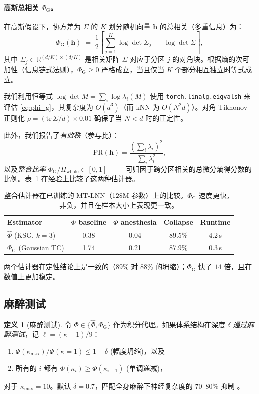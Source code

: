 \documentclass[11pt]{article}
\theoremstyle{definition}
\newtheorem{definition}{定义}[section]
\newcommand{\RR}{\mathbb{R}}
\newcommand{\vh}{\mathbf{h}}
\newcommand{\phihat}{\hat{\Phi}}
\newcommand{\phig}{\Phi_{\mathrm{G}}}
\begin{document}
\paragraph{高斯总相关 $\phig$。}
在高斯假设下，协方差为 $\Sigma$ 的 $K$ 划分随机向量 $\vh$ 的总相关（多重信息）为：
\begin{equation}
  \phig(\vh) \;=\; \frac{1}{2}\left[\sum_{j=1}^{K}\log\det\Sigma_j \;-\; \log\det\Sigma\right],
  \label{eq:phi_g}
\end{equation}
其中 $\Sigma_j\in\RR^{(d/K)\times(d/K)}$ 是相关矩阵 $\Sigma$ 对应于分区 $j$ 的对角块。根据熵的次可加性（信息链式法则），$\phig \ge 0$ 严格成立，当且仅当 $K$ 个部分相互独立时等式成立。

我们利用恒等式 $\log\det M = \sum_i\log\lambda_i(M)$ 使用 \texttt{torch.linalg.eigvalsh} 来评估 \eqref{eq:phi_g}，其复杂度为 $O(d^3)$（而 kNN 为 $O(N^2 d)$）。对角 Tikhonov 正则化 $\rho = (\mathrm{tr}\,\Sigma / d)\times 0.01$ 确保了当 $N < d$ 时的正定性。

此外，我们报告了\emph{有效秩}（参与比）：
\begin{equation}
  \mathrm{PR}(\vh) = \frac{\left(\sum_i\lambda_i\right)^2}{\sum_i\lambda_i^2},
  \label{eq:pr}
\end{equation}
以及\emph{整合比率} $\phig / H_\text{whole} \in [0,1]$ —— 可归因于跨分区相关的总微分熵得分数的比例。表~\ref{tab:phi_compare} 在经验上比较了这两种估计器。

\begin{table}[h]
\centering
\caption{整合估计器在已训练的 MT-LNN（128M 参数）上的比较。$\phig$ 速度更快，非负，并且在样本大小上表现更一致。}
\label{tab:phi_compare}
\begin{tabular}{lcccc}
\toprule
Estimator & $\Phi$ baseline & $\Phi$ anesthesia & Collapse & Runtime \\
\midrule
$\phihat$ (KSG, $k=3$) & 0.38 & 0.04 & 89.5\% & 4.2\,s \\
$\phig$ (Gaussian TC) & 1.74 & 0.21 & 87.9\% & 0.3\,s \\
\bottomrule
\end{tabular}
\end{table}

两个估计器在定性结论上是一致的（89\% 对 88\% 的坍缩）；$\phig$ 快了 $14$ 倍，且在数值上更加稳定。

\subsection{麻醉测试}
\begin{definition}[麻醉测试]
令 $\Phi\in\{\phihat,\phig\}$ 作为积分代理。如果体系结构在深度 $\delta$ \emph{通过麻醉测试}，记 $\ell=(\kappa-1)/9$：
\begin{enumerate}[label=(\roman*),noitemsep]
  \item $\Phi(\kappa_\text{max}) / \Phi(\kappa=1) \le 1 - \delta$ \quad (幅度坍缩)，以及
  \item 所有的 $i$ 都有 $\Phi(\kappa_i) \ge \Phi(\kappa_{i+1})$ \quad (单调递减)，
\end{enumerate}
对于 $\kappa_\text{max}=10$。默认 $\delta=0.7$，匹配全身麻醉下神经复杂度的 70--80\% 抑制 \citep{casali2013thecover}。
\end{definition}
\end{document}
